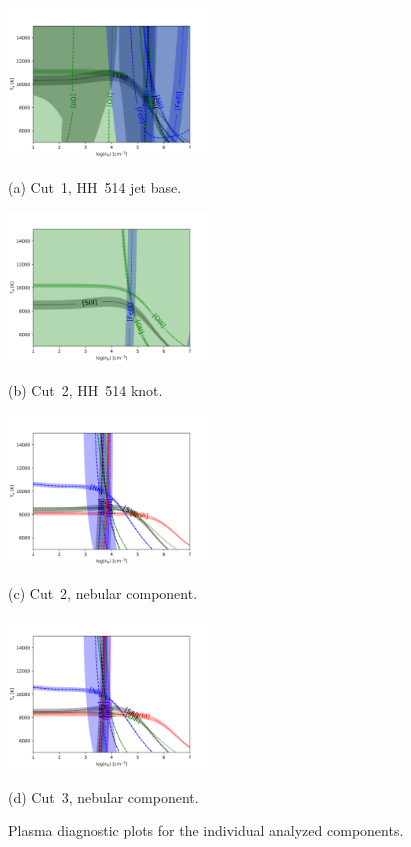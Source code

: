 \documentclass[fleqn,usenatbib]{mnras}
\begin{document}
\begin{figure}
  \begin{minipage}{7.5cm}
    \centering\includegraphics[height=4cm,width=\columnwidth]{HH514I.png}
    \centerline{(a) Cut~1, HH~514 jet base.}
  \end{minipage}
  \begin{minipage}{7.5cm}
     \centering\includegraphics[height=4cm,width=\columnwidth]{HH514II.png}
    \centerline{(b) Cut~2, HH~514 knot.}
  \end{minipage}
 
  \begin{minipage}{7.5cm}
   \centering\includegraphics[height=4cm,width=\columnwidth]{neb_cut2.png}
   \centerline{(c) Cut~2, nebular component.}
  \end{minipage}
  \begin{minipage}{7.5cm}
    \centering\includegraphics[height=4cm,width=\columnwidth]{neb_cut3.png}
    \centerline{(d) Cut~3, nebular component.}
  \end{minipage}
  \caption{Plasma diagnostic plots for the individual analyzed components.}
\label{fig:plasma}
\end{figure}
\end{document}
